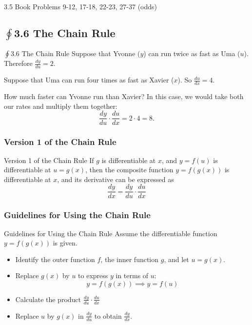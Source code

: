 \documentclass[cal1spr16Lectures.tex]{subfiles}
\begin{document}
\begin{frame}
\begin{block}{3.5 Book Problems} 9-12, 17-18, 22-23, 27-37 (odds) \end{block}
\end{frame}

\subsection[3.6 The Chain Rule]{$\textstyle\oint$3.6 The Chain Rule}

\begin{frame}{$\oint$3.6 The Chain Rule}\footnotesize
Suppose that Yvonne ($y$) can run twice as fast as Uma ($u$). Therefore $\frac{dy}{du}=2$.

\vspace{1pc}
Suppose that Uma can run four times as fast as Xavier ($x$).  So $\frac{du}{dx}=4$.

\vspace{1pc}
How much faster can Yvonne run than Xavier?  In this case, we would take both our rates and multiply them together:
\[\frac{dy}{du} \cdot \frac{du}{dx}=2 \cdot 4 = 8.\]
\end{frame}

\subsubsection{Version 1 of the Chain Rule}

\begin{frame}{\small Version 1 of the Chain Rule}
If $g$ is differentiable at $x$, and $y=f(u)$ is differentiable at $u=g(x)$, then the composite function $y=f(g(x))$ is differentiable at $x$, and its derivative can be expressed as 
\[\frac{dy}{dx}=\frac{dy}{du} \cdot \frac{du}{dx}\]
\end{frame}

\subsubsection{Guidelines for Using the Chain Rule}

\begin{frame}{\small Guidelines for Using the Chain Rule}\footnotesize
Assume the differentiable function $y=f(g(x))$ is given.
\begin{itemize}
	\item[1.] Identify the outer function $f$, the inner function $g$, and let $u=g(x).$
	\item[2.] Replace $g(x)$ by $u$ to express $y$ in terms of $u$:
	\[y=f(g(x)) \implies y=f(u)\]
	\item[3.]  Calculate the product $\frac{dy}{du} \cdot \frac{du}{dx}$
	\item[4.] Replace $u$ by $g(x)$ in $\frac{dy}{du}$ to obtain $\frac{dy}{dx}.$
\end{itemize}
\end{frame}
\end{document}

